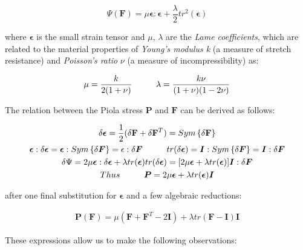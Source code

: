 \begin{equation}
\label{eq:linearelasticity}
 \Psi(\mathbf{F}) = \mu\boldsymbol{\epsilon}:\boldsymbol{\epsilon} + \frac{\lambda}{2}tr^2(\boldsymbol{\epsilon})
\end{equation}

where $\boldsymbol{\epsilon}$ is the small strain tensor and $\mu$, $\lambda$ are the \textit{Lame coefficients}, which are related to
the material properties of \textit{Young's modulus k} (a measure of stretch resistance) and \textit{Poisson's ratio} $\nu$ (a 
measure of incompressibility) as:

\begin{align*}
\mu=\frac{k}{2(1+\nu)} \hspace{10 mm} \lambda=\frac{k\nu}{(1+\nu)(1-2\nu)}
\end{align*}

The relation between the Piola stress $\mathbf{P}$ and $\mathbf{F}$ can be derived as follows:

\begin{gather*}
\delta \boldsymbol{\epsilon} =\frac{1}{2}(\delta\mathbf{F} + \delta\mathbf{F}^T)=Sym\left\{\delta\mathbf{F}\right\}  \\
\boldsymbol{\epsilon}:\delta\boldsymbol{\epsilon}=\boldsymbol{\epsilon}:Sym\left\{\delta\boldsymbol{F}\right\}=\epsilon:\delta\boldsymbol{F} \hspace{10 mm}
tr(\delta\boldsymbol{\epsilon})=\boldsymbol{I}:Sym\left\{\delta\boldsymbol{F}\right\}=\boldsymbol{I}:\delta\boldsymbol{F} \\
\delta\Psi=2\mu\boldsymbol{\epsilon}:\delta\boldsymbol{\epsilon}+\lambda tr(\boldsymbol{\epsilon})  tr(\delta\boldsymbol{\epsilon})=[2\mu\boldsymbol{\epsilon}+\lambda tr(\boldsymbol{\epsilon})]\boldsymbol{I}:\delta\boldsymbol{F}\\
Thus \hspace{10 mm} \boldsymbol{P}=2\mu\boldsymbol{\epsilon}+\lambda tr(\boldsymbol{\epsilon})\boldsymbol{I}
\end{gather*}

after one final substitution for $\boldsymbol{\epsilon}$ and a few algebraic reductions:

\begin{align*}
  \boldsymbol{P}(\boldsymbol{F})=\mu(\boldsymbol{F} + \boldsymbol{F}^T-2\boldsymbol{I})+\lambda tr(\boldsymbol{F} - \boldsymbol{I})\boldsymbol{I}
\end{align*}

These expressions allow us to make the following observations:

